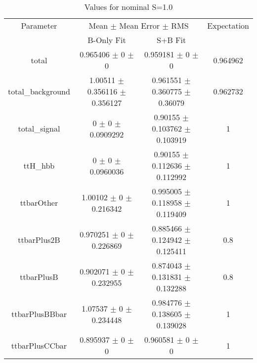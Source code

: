 \begin{table}
\centering
\caption{Values for nominal S=1.0}
\begin{tabular}{cccc}
\toprule
Parameter & \multicolumn{2}{c}{Mean $\pm$ Mean Error $\pm$ RMS} & Expectation\\
 & B-Only Fit & S+B Fit & \\
\midrule
total & \num{0.965406} $\pm$ \num{0} $\pm$ \num{0} & \num{0.959181} $\pm$ \num{0} $\pm$ \num{0} & \num{0.964962}\\
total\_background & \num{1.00511} $\pm$ \num{0.356116} $\pm$ \num{0.356127} & \num{0.961551} $\pm$ \num{0.360775} $\pm$ \num{0.36079} & \num{0.962732}\\
total\_signal & \num{0} $\pm$ \num{0} $\pm$ \num{0.0909292} & \num{0.90155} $\pm$ \num{0.103762} $\pm$ \num{0.103919} & \num{1}\\
ttH\_hbb & \num{0} $\pm$ \num{0} $\pm$ \num{0.0960036} & \num{0.90155} $\pm$ \num{0.112636} $\pm$ \num{0.112992} & \num{1}\\
ttbarOther & \num{1.00102} $\pm$ \num{0} $\pm$ \num{0.216342} & \num{0.995005} $\pm$ \num{0.118958} $\pm$ \num{0.119409} & \num{1}\\
ttbarPlus2B & \num{0.970251} $\pm$ \num{0} $\pm$ \num{0.226869} & \num{0.885466} $\pm$ \num{0.124942} $\pm$ \num{0.125411} & \num{0.8}\\
ttbarPlusB & \num{0.902071} $\pm$ \num{0} $\pm$ \num{0.232955} & \num{0.874043} $\pm$ \num{0.131831} $\pm$ \num{0.132288} & \num{0.8}\\
ttbarPlusBBbar & \num{1.07537} $\pm$ \num{0} $\pm$ \num{0.234448} & \num{0.984776} $\pm$ \num{0.138605} $\pm$ \num{0.139028} & \num{1}\\
ttbarPlusCCbar & \num{0.895937} $\pm$ \num{0} $\pm$ \num{0} & \num{0.960581} $\pm$ \num{0} $\pm$ \num{0} & \num{1}\\
\bottomrule
\end{tabular}
\end{table}
